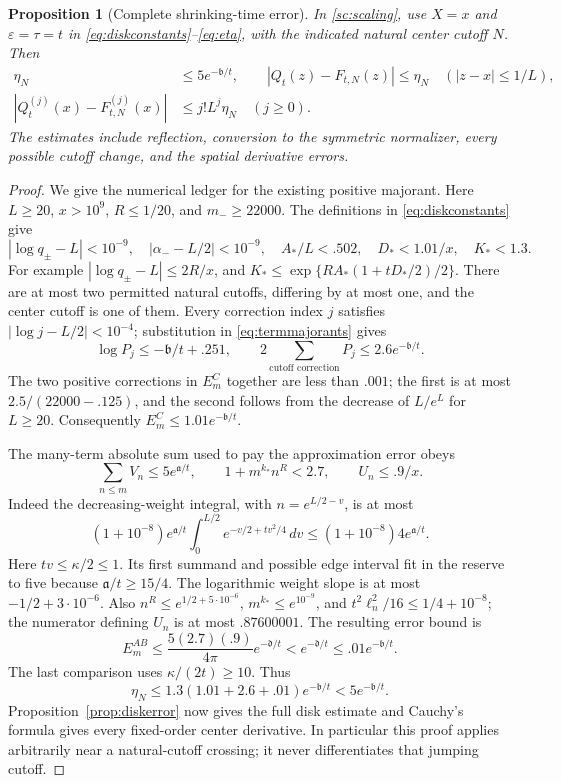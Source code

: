 \documentclass[11pt]{article}
\numberwithin{equation}{section}
\newtheorem{proposition}[theorem]{Proposition}
\theoremstyle{definition}
\theoremstyle{remark}
\newcommand{\dd}{\,d}
\begin{document}
\begin{proposition}[Complete shrinking-time error]
\label{sc:paiderror}
In \eqref{sc:scaling}, use $X=x$ and $\varepsilon=\tau=t$ in
\eqref{eq:diskconstants}--\eqref{eq:eta}, with the indicated natural
center cutoff $N$. Then
\begin{equation}\label{sc:diskpayment}
 \begin{aligned}
 \eta_N&\le5e^{-\mathfrak b/t},\qquad
 |Q_t(z)-F_{t,N}(z)|\le\eta_N\quad(|z-x|\le1/L),\\
 |Q_t^{(j)}(x)-F_{t,N}^{(j)}(x)|&\le j!L^j\eta_N
 \quad(j\ge0).
 \end{aligned}
\end{equation}
The estimates include reflection, conversion to the symmetric
normalizer, every possible cutoff change, and the spatial derivative errors.
\end{proposition}
\begin{proof}
We give the numerical ledger for the existing positive majorant. Here
$L\ge20$, $x>10^9$, $R\le1/20$, and $m_-\ge22000$.
The definitions in \eqref{eq:diskconstants} give
\[
 |\log q_\pm-L|<10^{-9},\quad
 |\alpha_- -L/2|<10^{-9},\quad
 A_*/L<.502,\quad D_*<1.01/x,\quad K_*<1.3.
\]
For example $|\log q_\pm-L|\le2R/x$, and
$K_*\le\exp\{RA_*(1+tD_*/2)/2\}$. There are at most two permitted
natural cutoffs, differing by at most one, and the center cutoff is one of
them. Every correction index $j$ satisfies
$|\log j-L/2|<10^{-4}$; substitution in \eqref{eq:termmajorants} gives
\[
 \log P_j\le-\mathfrak b/t+.251,\qquad
 2\sum_{\text{cutoff correction}}P_j\le2.6e^{-\mathfrak b/t}.
\]
The two positive corrections in $E_m^C$ together are less than $.001$;
the first is at most $2.5/(22000-.125)$, and the second follows from
the decrease of $L/e^L$ for $L\ge20$. Consequently
$E_m^C\le1.01e^{-\mathfrak b/t}$.

The many-term absolute sum used to pay the approximation error obeys
\[
 \sum_{n\le m}V_n\le5e^{\mathfrak a/t},\qquad
 1+m^{k_*}n^R<2.7,\qquad U_n\le.9/x.
\]
Indeed the decreasing-weight integral, with $n=e^{L/2-v}$, is at most
\[
 (1+10^{-8})e^{\mathfrak a/t}
 \int_0^{L/2}e^{-v/2+tv^2/4}\dd v
 \le(1+10^{-8})4e^{\mathfrak a/t}.
\]
Here $tv\le\kappa/2\le1$. Its first summand and possible edge interval
fit in the reserve to five because $\mathfrak a/t\ge15/4$.
The logarithmic weight slope is at most $-1/2+3\cdot10^{-6}$.
Also $n^R\le e^{1/2+5\cdot10^{-6}}$, $m^{k_*}\le e^{10^{-9}}$,
and $t^2\ell_n^2/16\le1/4+10^{-8}$; the numerator defining $U_n$
is at most $.87600001$. The resulting error bound is
\[
 E_m^{AB}\le\frac{5(2.7)(.9)}{4\pi}e^{-\mathfrak d/t}
 <e^{-\mathfrak d/t}\le.01e^{-\mathfrak b/t}.
\]
The last comparison uses $\kappa/(2t)\ge10$. Thus
\[
 \eta_N\le1.3(1.01+2.6+.01)e^{-\mathfrak b/t}<5e^{-\mathfrak b/t}.
\]
Proposition~\ref{prop:diskerror} now gives the full disk estimate and
Cauchy's formula gives every fixed-order center derivative. In particular
this proof applies arbitrarily near a natural-cutoff crossing; it never
differentiates that jumping cutoff.
\end{proof}
\end{document}

